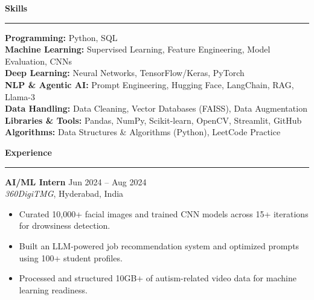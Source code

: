 \documentclass[9pt, letterpaper]{article}
\newcommand{\sectionheading}[1]{%
    \vspace{4pt}%
    {\large \textbf{#1}}%
    \vspace{1pt}%
    \hrule
    \vspace{2pt}%
}
\begin{document}
\sectionheading{Skills}
\textbf{Programming:} Python, SQL\\
\textbf{Machine Learning:} Supervised Learning, Feature Engineering, Model Evaluation, CNNs\\
\textbf{Deep Learning:} Neural Networks, TensorFlow/Keras, PyTorch\\
\textbf{NLP \& Agentic AI:} Prompt Engineering, Hugging Face, LangChain, RAG, Llama-3\\
\textbf{Data Handling:} Data Cleaning, Vector Databases (FAISS), Data Augmentation\\
\textbf{Libraries \& Tools:} Pandas, NumPy, Scikit-learn, OpenCV, Streamlit, GitHub\\
\textbf{Algorithms:} Data Structures \& Algorithms (Python), LeetCode Practice

\sectionheading{Experience}
\textbf{AI/ML Intern} \hfill Jun 2024 -- Aug 2024 \\
\textit{360DigiTMG}, Hyderabad, India
\begin{itemize}[leftmargin=0.25in, itemindent=-0.15in, label={--}]
    \item Curated 10,000+ facial images and trained CNN models across 15+ iterations for drowsiness detection.
    \item Built an LLM-powered job recommendation system and optimized prompts using 100+ student profiles.
    \item Processed and structured 10GB+ of autism-related video data for machine learning readiness.
\end{itemize}
\end{document}
